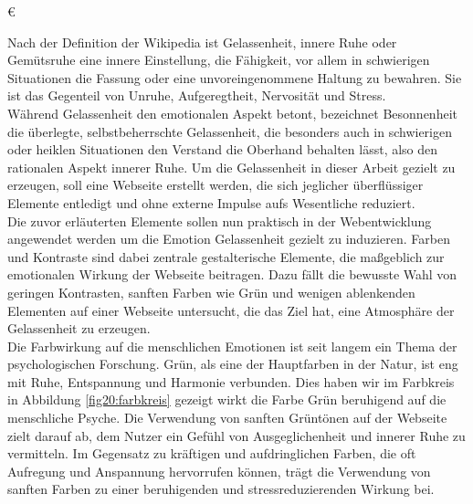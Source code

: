 €\documentclass[./dokumentation.tex]{subfiles}
\begin{document}
Nach der Definition der Wikipedia ist Gelassenheit, innere Ruhe oder Gemütsruhe eine innere Einstellung, die Fähigkeit, vor allem in schwierigen Situationen die Fassung oder eine unvoreingenommene Haltung zu bewahren. Sie ist das Gegenteil von Unruhe, Aufgeregtheit, Nervosität und Stress. \\
Während Gelassenheit den emotionalen Aspekt betont, bezeichnet Besonnenheit die überlegte, selbstbeherrschte Gelassenheit, die besonders auch in schwierigen oder heiklen Situationen den Verstand die Oberhand behalten lässt, also den rationalen Aspekt innerer Ruhe.
Um die Gelassenheit in dieser Arbeit gezielt zu erzeugen, soll eine Webseite erstellt werden, die sich jeglicher überflüssiger Elemente entledigt und ohne externe Impulse aufs Wesentliche reduziert.\\
Die zuvor erläuterten Elemente sollen nun praktisch in der Webentwicklung angewendet werden um die Emotion Gelassenheit gezielt zu induzieren. Farben und Kontraste sind dabei zentrale gestalterische Elemente, die maßgeblich zur emotionalen Wirkung der Webseite beitragen. Dazu fällt die bewusste Wahl von geringen Kontrasten, sanften Farben wie Grün und wenigen ablenkenden Elementen auf einer Webseite untersucht, die das Ziel hat, eine Atmosphäre der Gelassenheit zu erzeugen. \\

Die Farbwirkung auf die menschlichen Emotionen ist seit langem ein Thema der psychologischen Forschung. Grün, als eine der Hauptfarben in der Natur, ist eng mit Ruhe, Entspannung und Harmonie verbunden. Dies haben wir im Farbkreis in Abbildung \ref{fig20:farbkreis} gezeigt wirkt die Farbe Grün beruhigend auf die menschliche Psyche. Die Verwendung von sanften Grüntönen auf der Webseite zielt darauf ab, dem Nutzer ein Gefühl von Ausgeglichenheit und innerer Ruhe zu vermitteln. Im Gegensatz zu kräftigen und aufdringlichen Farben, die oft Aufregung und Anspannung hervorrufen können, trägt die Verwendung von sanften Farben zu einer beruhigenden und stressreduzierenden Wirkung bei.\\
\end{document}
